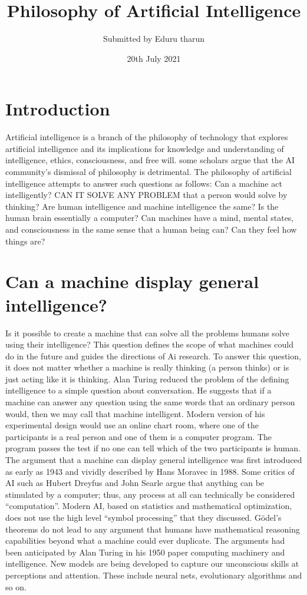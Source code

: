 \documentclass{article}
\title{Philosophy of Artificial Intelligence}
\author{Submitted by Eduru tharun}
\date{20th July 2021}
\begin{document}
\maketitle

\section{Introduction}
Artificial intelligence is a branch of the philosophy of technology that explores artificial intelligence and its implications for knowledge and understanding of intelligence, ethics, consciousness, and free will. some scholars argue that the AI community’s dismissal of philosophy is detrimental. The philosophy of artificial intelligence attempts to answer such questions as follows: Can a machine act intelligently? CAN IT SOLVE ANY PROBLEM that a person would solve by thinking? Are human intelligence and machine intelligence the same?
Is the human brain essentially a computer? Can machines have a mind, mental states, and consciousness in the same sense that a human being can? Can they feel how things are?
\section{Can a machine display general intelligence? }
Is it possible to create a machine that can solve all the problems humans solve using their intelligence? This question defines the scope of what machines could do in the future and guides the directions of Ai research. To answer this question, it does not matter whether a machine is really thinking (a person thinks) or is just acting like it is thinking.
Alan Turing reduced the problem of the defining intelligence to a simple question about conversation. He suggests that if a machine can answer any question using the same words that an ordinary person would, then we may call that machine intelligent. Modern version of his experimental design would use an online chart room, where one of the participants is a real person and one of them is a computer program. The program passes the test if no one can tell which of the two participants is human.
The argument that a machine can display general intelligence was first introduced as early as 1943 and vividly described by Hans Moravec in 1988. Some critics of AI such as Hubert Dreyfus and John Searle argue that anything can be stimulated by a computer; thus, any process at all can technically be considered “computation”.
Modern AI, based on statistics and mathematical optimization, does not use the high level “symbol processing” that they discussed. Gödel’s theorems do not lead to any argument that humans have mathematical reasoning capabilities beyond what a machine could ever duplicate. The arguments had been anticipated by Alan Turing in his 1950 paper computing machinery and intelligence. New models are being developed to capture our unconscious skills at perceptions and attention. These include neural nets, evolutionary algorithms and so on.
\end{document}
